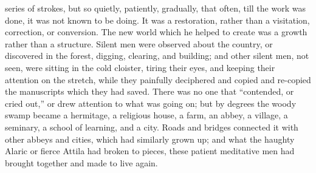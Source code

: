 series of strokes, but so quietly, patiently, gradually, that often,
till the work was done, it was not known to be doing. It was a
restoration, rather than a visitation, correction, or conversion. The
new world which he helped to create was a growth rather than a
structure. Silent men were observed about the country, or discovered
in the forest, digging, clearing, and building; and other silent men,
not seen, were sitting in the cold cloister, tiring their eyes, and
keeping their attention on the stretch, while they painfully
deciphered and copied and re-copied the manuscripts which they had
saved. There was no one that ``contended, or cried out,'' or
drew attention to what was going on; but by degrees the woody swamp
became a hermitage, a religious house, a farm, an abbey, a village, a
seminary, a school of learning, and a city. Roads and bridges
connected it with other abbeys and cities, which had similarly grown
up; and what the haughty Alaric or fierce Attila had broken to pieces,
these patient meditative men had brought together and made to live
again.

